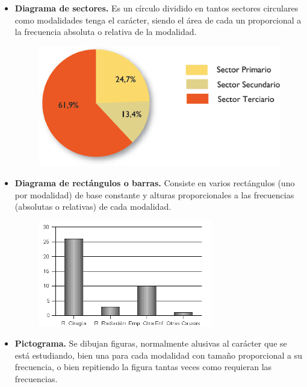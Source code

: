 \documentclass[]{article}
\begin{document}
	\begin{itemize}
		\item \textbf{Diagrama de sectores.} Es un círculo dividido en tantos sectores circulares como modalidades tenga el carácter, siendo el área de cada un proporcional a la frecuencia absoluta o relativa de la modalidad.
		\begin{figure}[h]
			\includegraphics[scale = 0.35]{sectores}
			\centering
		\end{figure}
		\item \textbf{Diagrama de rectángulos o barras. }Consiste en varios rectángulos (uno por modalidad) de base constante y alturas proporcionales a las frecuencias (absolutas o relativas) de cada modalidad.
		\begin{figure}[h]
			\includegraphics[scale = 0.5]{barras}
			\centering
		\end{figure}
	
		\item \textbf{Pictograma. }Se dibujan figuras, normalmente alusivas al carácter que se está estudiando, bien una para cada modalidad con tamaño proporcional a su frecuencia, o bien repitiendo la figura tantas veces como requieran las frecuencias.
		

\end{itemize}
\end{document}
